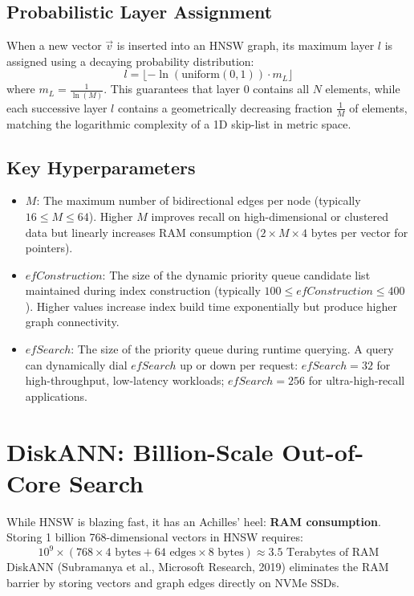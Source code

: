 \subsection{Probabilistic Layer Assignment}
When a new vector $\vec{v}$ is inserted into an HNSW graph, its maximum layer $l$ is assigned using a decaying probability distribution:
\begin{equation}
l = \lfloor -\ln(\text{uniform}(0, 1)) \cdot m_L \rfloor
\end{equation}
where $m_L = \frac{1}{\ln(M)}$. This guarantees that layer 0 contains all $N$ elements, while each successive layer $l$ contains a geometrically decreasing fraction $\frac{1}{M}$ of elements, matching the logarithmic complexity of a 1D skip-list in metric space.

\subsection{Key Hyperparameters}
\begin{itemize}[leftmargin=18pt]
  \item \textbf{$M$}: The maximum number of bidirectional edges per node (typically $16 \le M \le 64$). Higher $M$ improves recall on high-dimensional or clustered data but linearly increases RAM consumption ($2 \times M \times 4 \text{ bytes}$ per vector for pointers).
  \item \textbf{$efConstruction$}: The size of the dynamic priority queue candidate list maintained during index construction (typically $100 \le efConstruction \le 400$). Higher values increase index build time exponentially but produce higher graph connectivity.
  \item \textbf{$efSearch$}: The size of the priority queue during runtime querying. A query can dynamically dial $efSearch$ up or down per request: $efSearch=32$ for high-throughput, low-latency workloads; $efSearch=256$ for ultra-high-recall applications.
\end{itemize}

\section{DiskANN: Billion-Scale Out-of-Core Search}

While HNSW is blazing fast, it has an Achilles' heel: \textbf{RAM consumption}. Storing 1 billion 768-dimensional vectors in HNSW requires:
\begin{equation}
10^9 \times (768 \times 4 \text{ bytes} + 64 \text{ edges} \times 8 \text{ bytes}) \approx 3.5 \text{ Terabytes of RAM}
\end{equation}
DiskANN (Subramanya et al., Microsoft Research, 2019) eliminates the RAM barrier by storing vectors and graph edges directly on NVMe SSDs.

